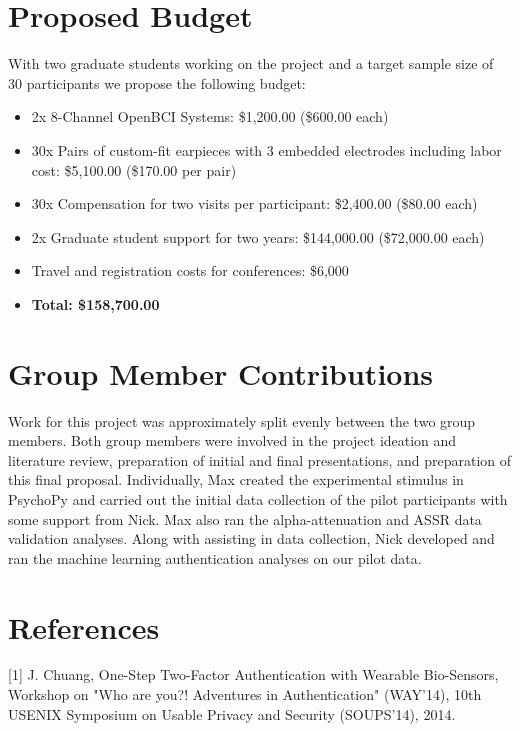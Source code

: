 \documentclass[11pt]{article}
\begin{document}
\section{Proposed Budget}
\label{sec:org7b5c0f3}
With two graduate students working on the project and a target sample size of 30 participants
we propose the following budget:

\begin{itemize}
\item 2x 8-Channel OpenBCI Systems: \$1,200.00 (\$600.00 each)
\item 30x Pairs of custom-fit earpieces with 3 embedded electrodes including labor cost: \$5,100.00 (\$170.00 per pair)
\item 30x Compensation for two visits per participant: \$2,400.00 (\$80.00 each)
\item 2x Graduate student support for two years: \$144,000.00 (\$72,000.00 each)
\item Travel and registration costs for conferences: \$6,000
\item \textbf{Total: \$158,700.00}
\end{itemize}

\section{Group Member Contributions}
Work for this project was approximately split evenly between the two group members. Both group members were involved in the project
ideation and literature review, preparation of initial and final presentations, and preparation of this final proposal. Individually, Max created
the experimental stimulus in PsychoPy and carried out the initial data collection of the pilot participants with some support from Nick. Max 
also ran the alpha-attenuation and ASSR data validation analyses. Along with assisting in data collection, Nick developed and ran the machine
 learning authentication analyses on our pilot data.

\section{References}
\label{sec:org0b0b225}
\setlength\parindent{0pt}

[1]
J. Chuang, One-Step Two-Factor Authentication with Wearable Bio-Sensors, Workshop on
"Who are you?! Adventures in Authentication" (WAY'14), 10th USENIX Symposium on
Usable Privacy and Security (SOUPS'14), 2014.
\hspace{0pt} \\
\end{document}
